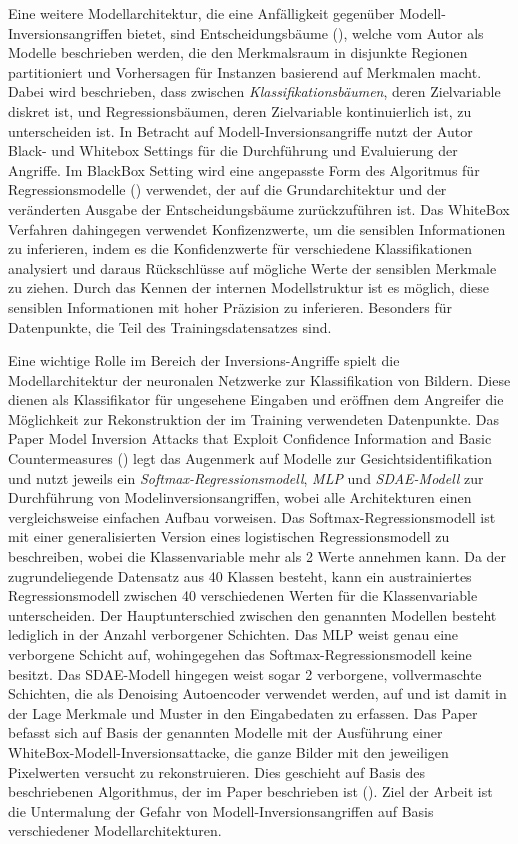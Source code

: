 Eine weitere Modellarchitektur, die eine Anfälligkeit gegenüber Modell-Inversionsangriffen bietet, sind Entscheidungsbäume (\cite[S. 4 ff.]{fredrikson_model_2015}), welche vom Autor als Modelle beschrieben werden, die den Merkmalsraum in disjunkte Regionen partitioniert und Vorhersagen für Instanzen basierend auf Merkmalen macht. Dabei wird beschrieben, dass zwischen \textit{Klassifikationsbäumen}, deren Zielvariable diskret ist, und Regressionsbäumen, deren Zielvariable kontinuierlich ist, zu unterscheiden ist. In Betracht auf Modell-Inversionsangriffe nutzt der Autor Black- und Whitebox Settings für die Durchführung und Evaluierung der Angriffe. Im BlackBox Setting wird eine angepasste Form des Algoritmus für Regressionsmodelle (\cite[21]{fredrikson_privacy_2014}) verwendet, der auf die Grundarchitektur und der veränderten Ausgabe der Entscheidungsbäume zurückzuführen ist. Das WhiteBox Verfahren dahingegen verwendet Konfizenzwerte, um die sensiblen Informationen zu inferieren, indem es die Konfidenzwerte für verschiedene Klassifikationen analysiert und daraus Rückschlüsse auf mögliche Werte der sensiblen Merkmale zu ziehen. Durch das Kennen der internen Modellstruktur ist es möglich, diese sensiblen Informationen mit hoher Präzision zu inferieren. Besonders für Datenpunkte, die Teil des Trainingsdatensatzes sind. 

Eine wichtige Rolle im Bereich der Inversions-Angriffe spielt die Modellarchitektur der neuronalen Netzwerke zur Klassifikation von Bildern. Diese dienen als Klassifikator für ungesehene Eingaben und eröffnen dem Angreifer die Möglichkeit zur Rekonstruktion der im Training verwendeten Datenpunkte. Das Paper \glqq Model Inversion Attacks that Exploit Confidence Information and Basic Countermeasures\grqq{} (\cite[7]{fredrikson_model_2015}) legt das Augenmerk auf Modelle zur Gesichtsidentifikation und nutzt jeweils ein \textit{Softmax-Regressionsmodell}, \textit{MLP} und \textit{SDAE-Modell} zur Durchführung von Modelinversionsangriffen, wobei alle Architekturen einen vergleichsweise einfachen Aufbau vorweisen. Das Softmax-Regressionsmodell ist mit einer generalisierten Version eines logistischen Regressionsmodell zu beschreiben, wobei die Klassenvariable mehr als 2 Werte annehmen kann. Da der zugrundeliegende Datensatz aus 40 Klassen besteht, kann ein austrainiertes Regressionsmodell zwischen 40 verschiedenen Werten für die Klassenvariable unterscheiden. Der Hauptunterschied zwischen den genannten Modellen  besteht lediglich in der Anzahl verborgener Schichten. Das MLP weist genau eine verborgene Schicht auf, wohingegehen das Softmax-Regressionsmodell keine besitzt. Das SDAE-Modell hingegen weist sogar 2 verborgene, vollvermaschte Schichten, die als \glqq Denoising Autoencoder\grqq{} verwendet werden, auf und ist damit in der Lage Merkmale und Muster in den Eingabedaten zu erfassen. Das Paper befasst sich auf Basis der genannten Modelle mit der Ausführung einer WhiteBox-Modell-Inversionsattacke, die ganze Bilder mit den jeweiligen Pixelwerten versucht zu rekonstruieren. Dies geschieht auf Basis des beschriebenen Algorithmus, der im Paper beschrieben ist (\cite[8]{fredrikson_model_2015}). Ziel der Arbeit ist die Untermalung der Gefahr von Modell-Inversionsangriffen auf Basis verschiedener Modellarchitekturen.

